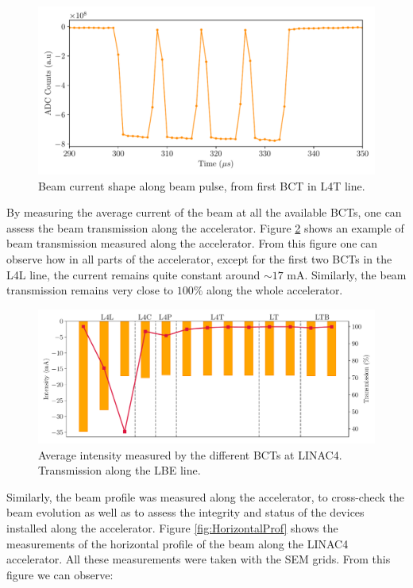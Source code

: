 \begin{figure}
    \centering
    \includegraphics[width=0.7\columnwidth]{IntensityVStime/IntensityVStime.pdf}
    \caption[The LOF caption]{Beam current shape along beam pulse, from first BCT in L4T line.}
    \label{fig:BCTwithTime}
\end{figure}

By measuring the average current of the beam at all the available BCTs, one can assess the beam transmission along the accelerator. Figure \ref{fig:BeamTrans} shows an example of beam transmission measured along the accelerator. From this figure one can observe how in all parts of the accelerator, except for the first two BCTs in the L4L line, the current remains quite constant around $\sim 17$ \si[]{\milli \ampere}.  Similarly, the beam transmission remains very close to $100 \%$ along the whole accelerator. 

\begin{figure}
    \centering
    \includegraphics[width=0.9\columnwidth]{BCT_Transmission/TransmissionBCT.pdf}
    \caption{Average intensity measured by the different BCTs at LINAC4. Transmission along the LBE line.}
    \label{fig:BeamTrans}
\end{figure}


Similarly, the beam profile was measured along the accelerator, to cross-check the beam evolution as well as to assess the integrity and status of the devices installed along the accelerator.  Figure \ref{fig:HorizontalProf} shows the measurements of the horizontal profile of the beam along the LINAC4 accelerator. All these measurements were taken with the SEM grids. From this figure we can observe:


